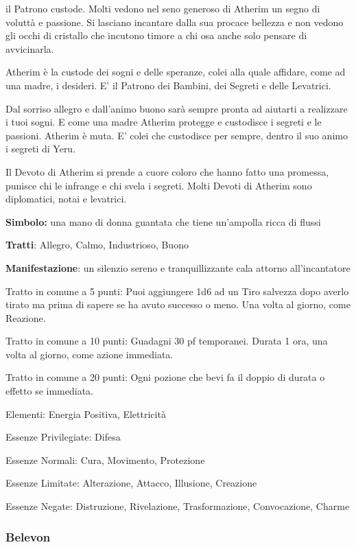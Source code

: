 \documentclass[a4paper,11pt,twoside,openany]{book}
\begin{document}
\label{atherim}

il Patrono custode. Molti vedono nel seno generoso di Atherim un segno di voluttà e passione. Si lasciano incantare dalla sua procace bellezza e non vedono gli occhi di cristallo che incutono timore a chi osa anche solo pensare di avvicinarla.

Atherim è la custode dei sogni e delle speranze, colei alla quale affidare, come ad una madre, i desideri. E' il Patrono dei Bambini, dei Segreti e delle Levatrici.

Dal sorriso allegro e dall'animo buono sarà sempre pronta ad aiutarti a realizzare i tuoi sogni. E come una madre Atherim protegge e custodisce i segreti e le passioni. Atherim è muta. E' colei che custodisce per sempre, dentro il suo animo i segreti di Yeru.

Il Devoto di Atherim si prende a cuore coloro che hanno fatto una promessa, punisce chi le infrange e chi svela i segreti. Molti Devoti di Atherim sono diplomatici, notai e levatrici.

\textbf{Simbolo:} una mano di donna guantata che tiene un'ampolla ricca di flussi

\textbf{Tratti}: Allegro, Calmo, Industrioso, Buono

\textbf{Manifestazione}: un silenzio sereno e tranquillizzante cala attorno all'incantatore

\bigskip

Tratto in comune a 5 punti: Puoi aggiungere 1d6 ad un Tiro salvezza dopo averlo tirato ma prima di sapere se ha avuto successo o meno. Una volta al giorno, come Reazione.

Tratto in comune a 10 punti: Guadagni 30 pf temporanei. Durata 1 ora, una volta al giorno, come azione immediata.

Tratto in comune a 20 punti: Ogni pozione che bevi fa il doppio di durata o effetto se immediata.

\bigskip

Elementi: Energia Positiva, Elettricità

\bigskip

Essenze Privilegiate: Difesa

Essenze Normali: Cura, Movimento, Protezione

Essenze Limitate: Alterazione, Attacco, Illusione, Creazione

Essenze Negate: Distruzione, Rivelazione, Trasformazione, Convocazione, Charme

\subsubsection{Belevon}
\end{document}
